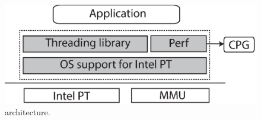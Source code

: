 
\begin{figure}[t]

\centering
      \includegraphics[scale=.35]{figure/System-basic-architecture}
  \caption{\projecttitle architecture.}
   
  \label{fig:basicSystem}

\end{figure}

